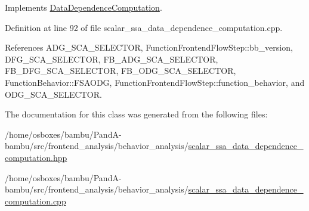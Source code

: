 Implements \hyperlink{classDataDependenceComputation_adeeabf6602796c390b4e331e553c71b9}{Data\+Dependence\+Computation}.



Definition at line 92 of file scalar\+\_\+ssa\+\_\+data\+\_\+dependence\+\_\+computation.\+cpp.



References A\+D\+G\+\_\+\+S\+C\+A\+\_\+\+S\+E\+L\+E\+C\+T\+OR, Function\+Frontend\+Flow\+Step\+::bb\+\_\+version, D\+F\+G\+\_\+\+S\+C\+A\+\_\+\+S\+E\+L\+E\+C\+T\+OR, F\+B\+\_\+\+A\+D\+G\+\_\+\+S\+C\+A\+\_\+\+S\+E\+L\+E\+C\+T\+OR, F\+B\+\_\+\+D\+F\+G\+\_\+\+S\+C\+A\+\_\+\+S\+E\+L\+E\+C\+T\+OR, F\+B\+\_\+\+O\+D\+G\+\_\+\+S\+C\+A\+\_\+\+S\+E\+L\+E\+C\+T\+OR, Function\+Behavior\+::\+F\+S\+A\+O\+DG, Function\+Frontend\+Flow\+Step\+::function\+\_\+behavior, and O\+D\+G\+\_\+\+S\+C\+A\+\_\+\+S\+E\+L\+E\+C\+T\+OR.



The documentation for this class was generated from the following files\+:\begin{DoxyCompactItemize}
\item 
/home/osboxes/bambu/\+Pand\+A-\/bambu/src/frontend\+\_\+analysis/behavior\+\_\+analysis/\hyperlink{scalar__ssa__data__dependence__computation_8hpp}{scalar\+\_\+ssa\+\_\+data\+\_\+dependence\+\_\+computation.\+hpp}\item 
/home/osboxes/bambu/\+Pand\+A-\/bambu/src/frontend\+\_\+analysis/behavior\+\_\+analysis/\hyperlink{scalar__ssa__data__dependence__computation_8cpp}{scalar\+\_\+ssa\+\_\+data\+\_\+dependence\+\_\+computation.\+cpp}\end{DoxyCompactItemize}
